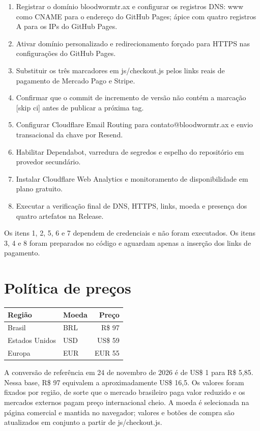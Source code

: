 ﻿\documentclass[11pt,a4paper]{article}
\begin{document}
\begin{enumerate}[label=\arabic*.]
\item Registrar o domínio bloodwormtr.ax e configurar os registros DNS: www como CNAME para o endereço do GitHub Pages; ápice com quatro registros A para os IPs do GitHub Pages.
\item Ativar domínio personalizado e redirecionamento forçado para HTTPS nas configurações do GitHub Pages.
\item Substituir os três marcadores em js/checkout.js pelos links reais de pagamento de Mercado Pago e Stripe.
\item Confirmar que o commit de incremento de versão não contém a marcação [skip ci] antes de publicar a próxima tag.
\item Configurar Cloudflare Email Routing para contato@bloodwormtr.ax e envio transacional da chave por Resend.
\item Habilitar Dependabot, varredura de segredos e espelho do repositório em provedor secundário.
\item Instalar Cloudflare Web Analytics e monitoramento de disponibilidade em plano gratuito.
\item Executar a verificação final de DNS, HTTPS, links, moeda e presença dos quatro artefatos na Release.
\end{enumerate}

Os itens 1, 2, 5, 6 e 7 dependem de credenciais e não foram executados. Os itens 3, 4 e 8 foram preparados no código e aguardam apenas a inserção dos links de pagamento.

\section{Política de preços}

\begin{table}[h]
\centering
\begin{tabular}{|l|l|r|}
\hline
Região & Moeda & Preço \\
\hline
Brasil & BRL & R\$ 97 \\
Estados Unidos & USD & US\$ 59 \\
Europa & EUR & EUR 55 \\
\hline
\end{tabular}\end{table}

A conversão de referência em 24 de novembro de 2026 é de US\$ 1 para R\$ 5,85. Nessa base, R\$ 97 equivalem a aproximadamente US\$ 16,5. Os valores foram fixados por região, de sorte que o mercado brasileiro paga valor reduzido e os mercados externos pagam preço internacional cheio. A moeda é selecionada na página comercial e mantida no navegador; valores e botões de compra são atualizados em conjunto a partir de js/checkout.js.
\end{document}
